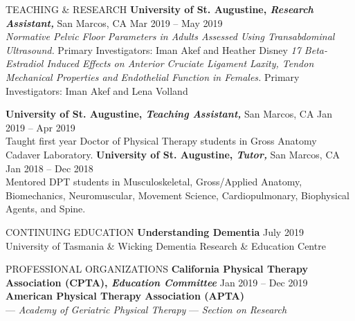 \documentclass{resume} %
\begin{document}
\begin{rSection}{TEACHING \& RESEARCH}
\textbf{University of St. Augustine, \textit{Research Assistant,}} San Marcos, CA \hfill Mar 2019 -- May 2019\\
\textit{Normative Pelvic Floor Parameters in Adults Assessed Using Transabdominal Ultrasound.} Primary Investigators: Iman Akef and Heather Disney
\textit{17 Beta-Estradiol Induced Effects on Anterior Cruciate Ligament Laxity, Tendon Mechanical Properties and Endothelial Function in Females.} Primary Investigators: Iman Akef and Lena Volland

\textbf{University of St. Augustine, \textit{Teaching Assistant,}} San Marcos, CA \hfill Jan 2019 -- Apr 2019 \\
Taught first year Doctor of Physical Therapy students in Gross Anatomy Cadaver Laboratory.
\textbf{University of St. Augustine, \textit{Tutor,}} San Marcos, CA \hfill Jan 2018 -- Dec 2018 \\
Mentored DPT students in Musculoskeletal, Gross/Applied Anatomy, Biomechanics, Neuromuscular, Movement Science, Cardiopulmonary, Biophysical Agents, and Spine.
\end{rSection} 
\begin{rSection}{CONTINUING EDUCATION}
\textbf{Understanding Dementia} \hfill July 2019\\
University of Tasmania \& Wicking Dementia Research \& Education Centre
\end{rSection}
\begin{rSection}{PROFESSIONAL ORGANIZATIONS}
\textbf{California Physical Therapy Association (CPTA), \textit{Education Committee}} \hfill{Jan 2019 -- Dec 2019}
~\\
\textbf{American Physical Therapy Association (APTA)}\\
\-\hspace{5mm} --- \textit{Academy of Geriatric Physical Therapy}
\-\hspace{5mm} --- \textit{Section on Research}
\end{rSection} 
\end{document}
